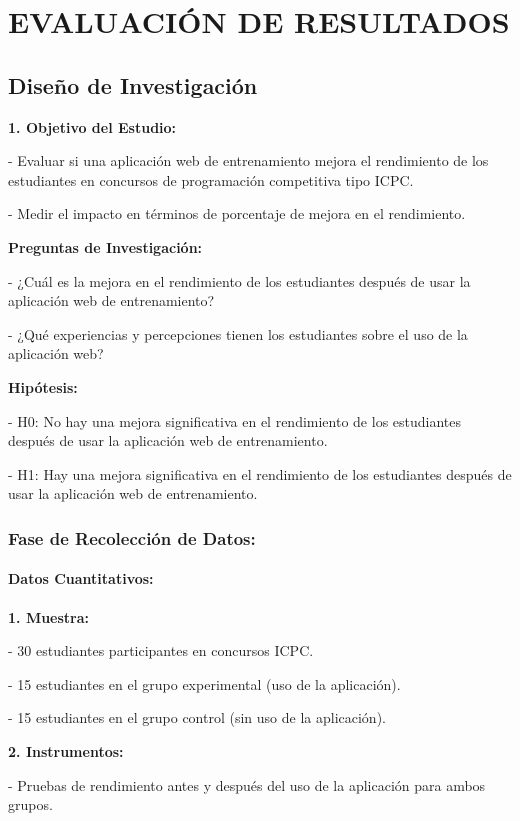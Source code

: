 \newpage
\chapter{EVALUACIÓN DE RESULTADOS}


\section{Diseño de Investigación}


\textbf{1. Objetivo del Estudio:}

   - Evaluar si una aplicación web de entrenamiento mejora el rendimiento de los estudiantes en concursos de programación competitiva tipo ICPC.
   
   - Medir el impacto en términos de porcentaje de mejora en el rendimiento.

\textbf{Preguntas de Investigación:}

   - ¿Cuál es la mejora en el rendimiento de los estudiantes después de usar la aplicación web de entrenamiento?
   
   - ¿Qué experiencias y percepciones tienen los estudiantes sobre el uso de la aplicación web?

\textbf{Hipótesis:}

   - H0: No hay una mejora significativa en el rendimiento de los estudiantes después de usar la aplicación web de entrenamiento.
   
   - H1: Hay una mejora significativa en el rendimiento de los estudiantes después de usar la aplicación web de entrenamiento.

\subsection{Fase de Recolección de Datos:}

\subsubsection{Datos Cuantitativos:}
\textbf{1. Muestra:}

   - 30 estudiantes participantes en concursos ICPC.
   
   - 15 estudiantes en el grupo experimental (uso de la aplicación).
   
   - 15 estudiantes en el grupo control (sin uso de la aplicación).

\textbf{2. Instrumentos:}

   - Pruebas de rendimiento antes y después del uso de la aplicación para ambos grupos.
   
